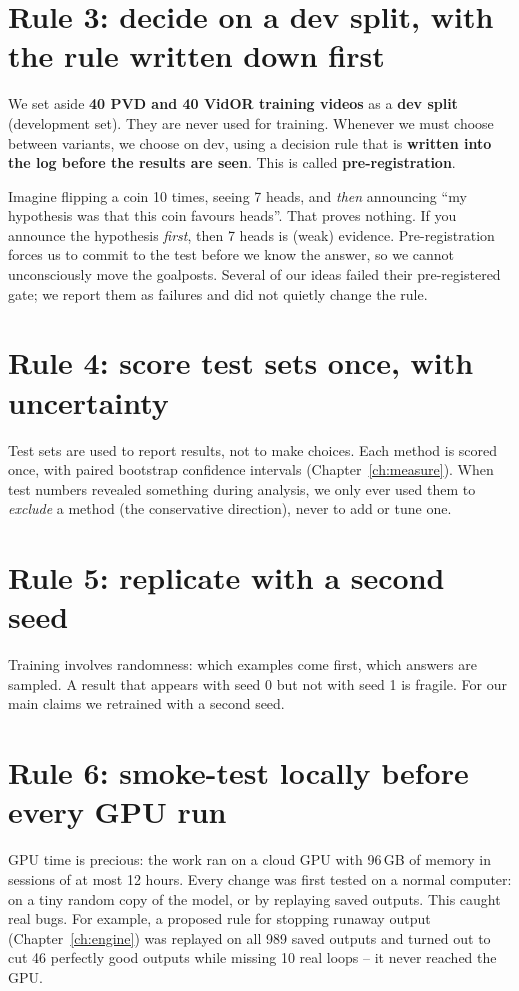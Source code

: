 \documentclass[11pt,openany]{book}
\begin{document}
\section{Rule 3: decide on a dev split, with the rule written down first}
We set aside \textbf{40 PVD and 40 VidOR training videos} as a \textbf{dev split} (development set). They are never used for
training. Whenever we must choose between variants, we choose on dev, using a decision rule that is \textbf{written into the log
before the results are seen}. This is called \textbf{pre-registration}.

\begin{keyidea}
Imagine flipping a coin 10 times, seeing 7 heads, and \emph{then} announcing ``my hypothesis was that this coin favours heads''.
That proves nothing. If you announce the hypothesis \emph{first}, then 7 heads is (weak) evidence. Pre-registration forces us to
commit to the test before we know the answer, so we cannot unconsciously move the goalposts. Several of our ideas failed their
pre-registered gate; we report them as failures and did not quietly change the rule.
\end{keyidea}

\section{Rule 4: score test sets once, with uncertainty}
Test sets are used to report results, not to make choices. Each method is scored once, with paired bootstrap confidence intervals
(Chapter~\ref{ch:measure}). When test numbers revealed something during analysis, we only ever used them to \emph{exclude} a method
(the conservative direction), never to add or tune one.

\section{Rule 5: replicate with a second seed}
Training involves randomness: which examples come first, which answers are sampled. A result that appears with seed 0 but not with
seed 1 is fragile. For our main claims we retrained with a second seed.

\section{Rule 6: smoke-test locally before every GPU run}
GPU time is precious: the work ran on a cloud GPU with 96\,GB of memory in sessions of at most 12 hours. Every change was first
tested on a normal computer: on a tiny random copy of the model, or by replaying saved outputs. This caught real bugs. For example,
a proposed rule for stopping runaway output (Chapter~\ref{ch:engine}) was replayed on all 989 saved outputs and turned out to cut
46 perfectly good outputs while missing 10 real loops -- it never reached the GPU.
\end{document}
